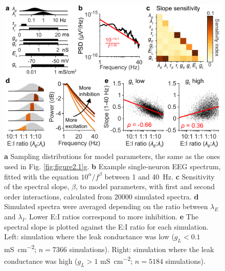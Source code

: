 \begin{figure}
  \begin{minipage}[c]{90mm}
    \includegraphics[width=\textwidth]{Figures/chapter2/figure6.pdf}
  \end{minipage}\hfill
  \begin{minipage}[c]{70mm}
    \caption{
	\textbf{a} Sampling distributions for model parameters, the same as the ones used in Fig. \ref{fig:figure2.1}g.
	\textbf{b} Example single-neuron EEG spectrum, fitted with the equation ${10}^\alpha/f^\beta$ between 1 and \qty{40}{\hertz}.
	\textbf{c} Sensitivity of the spectral slope, $\beta$, to model parameters, with first and second order interactions, calculated from 20000 simulated spectra.
	\textbf{d} Simulated spectra were averaged depending on the ratio between $\lambda_E$ and $\lambda_I$. Lower E:I ratios correspond to more inhibition.
	\textbf{e} The spectral slope is plotted against the E:I ratio for each simulation. Left: simulation where the leak conductance was low ($g_L<0.1$ \unit{\milli\siemens\per\centi\meter\squared}; $n=7366$ simulations). Right: simulation where the leak conductance was high ($g_L>1$ \unit{\milli\siemens\per\centi\meter\squared}; $n=5184$ simulations).
    } \label{fig:figure2.6}
  \end{minipage}
\end{figure}

